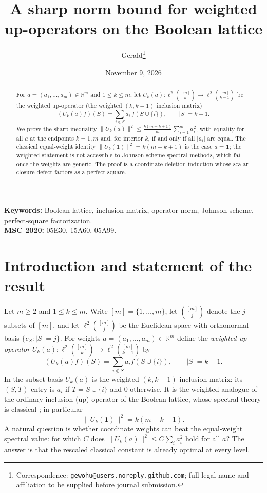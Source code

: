 \documentclass[11pt]{article}
\title{A sharp norm bound for weighted up-operators on the Boolean lattice}
\author{Gerald\thanks{Correspondence: \texttt{gewohu@users.noreply.github.com};
full legal name and affiliation to be supplied before journal submission.}}
\date{November 9, 2026}
\theoremstyle{remark}
\begin{document}
\maketitle

\begin{abstract}
For $a=(a_1,\dots,a_m)\in\mathbb{R}^m$ and $1\le k\le m$, let
$U_k(a):\ell^2\binom{[m]}{k}\to\ell^2\binom{[m]}{k-1}$ be the weighted
up-operator (the weighted $(k,k-1)$ inclusion matrix)
\[
(U_k(a)f)(S)=\sum_{i\notin S} a_i\, f(S\cup\{i\}),\qquad |S|=k-1 .
\]
We prove the sharp inequality
$\|U_k(a)\|^2\le \frac{k(m-k+1)}{m}\sum_{i=1}^m a_i^2$,
with equality for all $a$ at the endpoints $k=1,m$ and, for interior $k$,
if and only if all $|a_i|$ are equal. The classical equal-weight identity
$\|U_k(\mathbf 1)\|^2=k(m-k+1)$ is the case $a=\mathbf 1$; the weighted
statement is not accessible to Johnson-scheme spectral methods, which fail
once the weights are generic. The proof is a coordinate-deletion induction
whose scalar closure defect factors as a perfect square.
\end{abstract}

\noindent\textbf{Keywords:} Boolean lattice, inclusion matrix, operator norm,
Johnson scheme, perfect-square factorization.\\
\noindent\textbf{MSC 2020:} 05E30, 15A60, 05A99.

\section{Introduction and statement of the result}

Let $m\ge 2$ and $1\le k\le m$. Write $[m]=\{1,\dots,m\}$, let
$\binom{[m]}{j}$ denote the $j$-subsets of $[m]$, and let
$\ell^2\binom{[m]}{j}$ be the Euclidean space with orthonormal basis
$\{e_S:|S|=j\}$. For weights $a=(a_1,\dots,a_m)\in\mathbb{R}^m$ define the
\emph{weighted up-operator}
$U_k(a):\ell^2\binom{[m]}{k}\to\ell^2\binom{[m]}{k-1}$ by
\[
(U_k(a)f)(S)=\sum_{i\notin S}a_i f(S\cup\{i\}),\qquad |S|=k-1 .
\]
In the subset basis $U_k(a)$ is the weighted $(k,k-1)$ inclusion matrix:
its $(S,T)$ entry is $a_i$ if $T=S\cup\{i\}$ and $0$ otherwise. It is the
weighted analogue of the ordinary inclusion (up) operator of the Boolean
lattice, whose spectral theory is classical
\cite{srinivasan2011,bannai1984,godsilroyle2001}; in particular
\begin{equation}\label{eq:classical}
\|U_k(\mathbf 1)\|^2=k(m-k+1).
\end{equation}
A natural question is whether coordinate weights can beat the
equal-weight spectral value: for which $C$ does
$\|U_k(a)\|^2\le C\sum_i a_i^2$ hold for all $a$? The answer is that the
rescaled classical constant is already optimal at every level.
\end{document}

